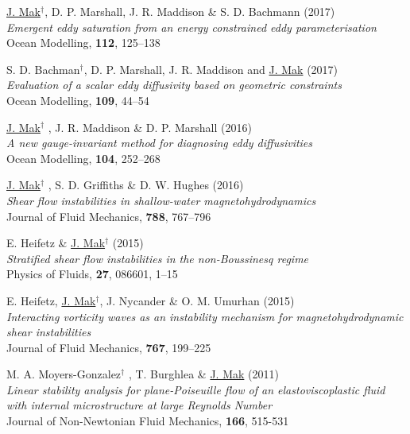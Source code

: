\documentclass[letterpaper]{article}
\renewenvironment{itemize}{
  \begin{list}{}{
    \setlength{\leftmargin}{1.5em}
  }
}{
  \end{list}
}
\begin{document}
\begin{itemize}
\item[7.] \underline{J. Mak}$^{\dagger}$, D. P. Marshall, J. R. Maddison \& S. D. Bachmann
(2017)\\
\textit{Emergent eddy saturation from an energy constrained eddy parameterisation}\\
Ocean Modelling, \textbf{112}, 125--138

\item[6.] S. D. Bachman$^{\dagger}$, D. P. Marshall, J. R. Maddison and \underline{J. Mak}
(2017)\\
\textit{Evaluation of a scalar eddy diffusivity based on geometric constraints}\\
Ocean Modelling, \textbf{109}, 44--54

\item[5.] \underline{J. Mak}$^{\dagger}$ , J. R. Maddison \& D. P. Marshall
(2016)\\
\textit{A new gauge-invariant method for diagnosing eddy diffusivities}\\
Ocean Modelling, \textbf{104}, 252--268

\item[4.] \underline{J. Mak}$^{\dagger}$ , S. D. Griffiths \& D. W. Hughes
(2016)\\
\textit{Shear flow instabilities in shallow-water magnetohydrodynamics}\\
Journal of Fluid Mechanics, \textbf{788}, 767--796

\item[3.] E. Heifetz \& \underline{J. Mak}$^{\dagger}$ (2015)\\
\textit{Stratified shear flow instabilities in the non-Boussinesq regime}\\
Physics of Fluids, \textbf{27}, 086601, 1--15

\item[2.] E. Heifetz, \underline{J. Mak}$^{\dagger}$, J. Nycander \& O. M.
Umurhan (2015)\\
\textit{Interacting vorticity waves as an instability mechanism for
magnetohydrodynamic shear instabilities}\\
Journal of Fluid Mechanics, \textbf{767}, 199--225

\item[1.] M. A. Moyers-Gonzalez$^{\dagger}$ , T. Burghlea \& \underline{J. Mak}
(2011)\\
\textit{Linear stability analysis for plane-Poiseuille flow of an
elastoviscoplastic fluid with internal microstructure at large Reynolds
Number}\\
Journal of Non-Newtonian Fluid Mechanics, \textbf{166}, 515-531
\end{itemize}
\end{document}
